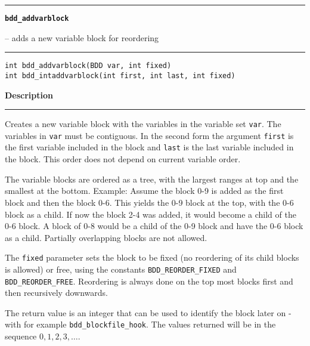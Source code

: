 \begin{minipage}{\textwidth}

\noindent\begin{minipage}{\textwidth}
\rule{\textwidth}{0.5mm}
{\tt\bf bdd\_addvarblock }
\--- adds a new variable block for reordering  \hspace{\fill}
\\\rule[1.5ex]{\textwidth}{0.5mm}
\end{minipage}

\noindent\begin{verbatim}
int bdd_addvarblock(BDD var, int fixed)
int bdd_intaddvarblock(int first, int last, int fixed) 
\end{verbatim}

\vspace{\parsep}\noindent
{\bf Description}\\\rule[1.5ex]{\textwidth}{0.2mm}\vspace{-1.5ex}\setlength{\parindent}{1em}
Creates a new variable block with the variables in the variable
           set {\tt var}. The variables in {\tt var} must be contiguous.
	   In the second form the argument {\tt first} is the first variable
	   included in the block and {\tt last} is the last variable included
	   in the block. This order does not depend on current variable
	   order.

	   The variable blocks are ordered as a tree, with the largest
	   ranges at top and the smallest at the bottom. Example: Assume
	   the block 0-9 is added as the first block and then the block 0-6.
	   This yields the 0-9 block at the top, with the 0-6 block as a
	   child. If now the block 2-4 was added, it would become a child
	   of the 0-6 block. A block of 0-8 would be a child of the 0-9
	   block and have the 0-6 block as a child. Partially overlapping
	   blocks are not allowed.

	   The {\tt fixed} parameter sets the block to be fixed (no
	   reordering of its child blocks is allowed) or free, using
	   the constants {\tt BDD\_REORDER\_FIXED} and {\tt
	   BDD\_REORDER\_FREE}.  Reordering is always done on the top
	   most blocks first and then recursively downwards.

	   The return value is an integer that can be used to identify
	   the block later on - with for example {\tt bdd\_blockfile\_hook}.
	   The values returned will be in the sequence $0,1,2,3,\ldots$.
	   


\end{minipage}
